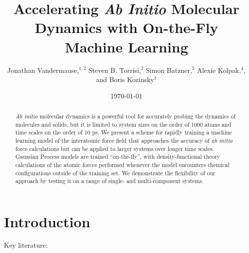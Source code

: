 \documentclass[%
reprint,
amsmath,amssymb,
aps,
]{revtex4-1}
\begin{document}
\title{Accelerating \textit{Ab Initio} Molecular Dynamics with On-the-Fly
Machine Learning}

\author{Jonathan Vandermause,$^{1,2}$ Steven B. Torrisi,$^{2}$
    Simon Batzner,$^{3}$ Alexie Kolpak,$^{4}$, and Boris Kozinsky$^{1}$}

\date{\today}

\begin{abstract}
\textit{Ab initio} molecular dynamics is a powerful tool for
accurately probing the dynamics of molecules and solids, but it is limited
to system sizes on the order of 1000 atoms and time scales on the order of
10 ps. We present a scheme for rapidly training a machine learning 
model of the interatomic force field that approaches the accuracy of \textit{ab initio} force calculations but can be applied to larger systems over longer time scales. Gaussian Process models are trained “on-the-fly”, with density-functional theory calculations of the atomic forces performed whenever the model encounters chemical configurations outside of the training set. We demonstrate the flexibility of our approach by testing it on a range of single- and multi-component systems.
\end{abstract}

\maketitle

\section{\label{sec:level1}Introduction}
\noindent
Key literature:
\end{document}
